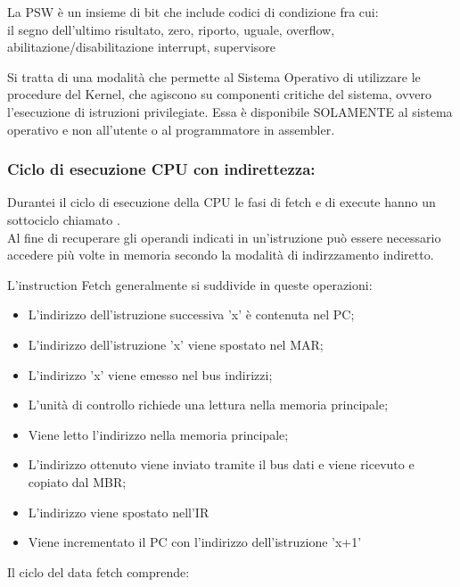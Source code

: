 \documentclass[arch.tex]{subfiles}
\begin{document}
La PSW è un insieme di bit che include codici di condizione fra cui:\\
il segno dell'ultimo risultato, zero, riporto, uguale, overflow, abilitazione/disabilitazione interrupt, supervisore

Si tratta di una modalità che permette al Sistema Operativo di utilizzare le procedure del Kernel, che agiscono su componenti
critiche del sistema, ovvero l'esecuzione di istruzioni privilegiate. Essa è disponibile SOLAMENTE al sistema operativo e non 
all'utente o al programmatore in assembler.

\subsubsection{Ciclo di esecuzione CPU con indirettezza:}
Durantei il ciclo di esecuzione della CPU le fasi di fetch e di execute hanno un sottociclo 
chiamato  .\\
Al fine di recuperare gli operandi indicati in un'istruzione può essere necessario accedere più volte in memoria
secondo la modalità di indirzzamento indiretto.

%
\label{par:flusso_dei_dati}
L'instruction Fetch generalmente si suddivide in queste operazioni:

\begin{itemize}
	\item L'indirizzo dell'istruzione successiva 'x' è contenuta nel PC;
	\item L'indirizzo dell'istruzione 'x' viene spostato nel MAR;
	\item L'indirizzo 'x' viene emesso nel bus indirizzi;
	\item L'unità di controllo richiede una lettura nella memoria principale;
	\item Viene letto l'indirizzo nella memoria principale;
	\item L'indirizzo ottenuto viene inviato tramite il bus dati e viene 
		ricevuto e copiato dal MBR;
	\item L'indirizzo viene spostato nell'IR
	\item Viene incrementato il PC con l'indirizzo dell'istruzione 'x+1'
\end{itemize}


%
\label{par:data_fetch}
Il ciclo del data fetch comprende:
\end{document}
